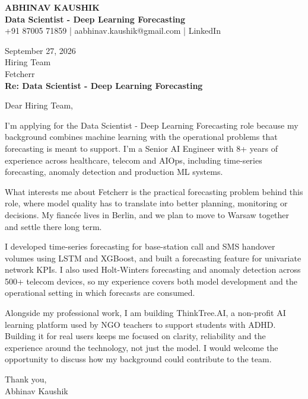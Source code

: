 \documentclass[10pt,a4paper]{article}
\begin{document}
\begin{center}
{\Large\bfseries ABHINAV KAUSHIK}\\[2pt]
{\bfseries Data Scientist - Deep Learning Forecasting}\\[2pt]
+91 87005 71859 \quad | \quad aabhinav.kaushik@gmail.com \quad | \quad LinkedIn
\end{center}
\vspace{8pt}
September 27, 2026\\[6pt]
Hiring Team\\
Fetcherr\\[4pt]
\textbf{Re: Data Scientist - Deep Learning Forecasting}

Dear Hiring Team,

I’m applying for the Data Scientist - Deep Learning Forecasting role because my background combines machine learning with the operational problems that forecasting is meant to support. I’m a Senior AI Engineer with 8+ years of experience across healthcare, telecom and AIOps, including time-series forecasting, anomaly detection and production ML systems.

What interests me about Fetcherr is the practical forecasting problem behind this role, where model quality has to translate into better planning, monitoring or decisions. My fiancée lives in Berlin, and we plan to move to Warsaw together and settle there long term.

I developed time-series forecasting for base-station call and SMS handover volumes using LSTM and XGBoost, and built a forecasting feature for univariate network KPIs. I also used Holt-Winters forecasting and anomaly detection across 500+ telecom devices, so my experience covers both model development and the operational setting in which forecasts are consumed.

Alongside my professional work, I am building ThinkTree.AI, a non-profit AI learning platform used by NGO teachers to support students with ADHD. Building it for real users keeps me focused on clarity, reliability and the experience around the technology, not just the model. I would welcome the opportunity to discuss how my background could contribute to the team.

Thank you,\\
Abhinav Kaushik
\end{document}
